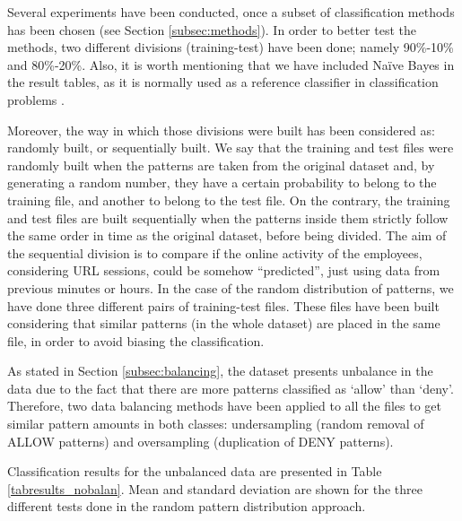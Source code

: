 \documentclass{llncs}
\begin{document}
\noindent Several experiments have been conducted, once a subset of classification methods has been chosen (see Section \ref{subsec:methods}). In order to better test the methods, two different divisions (training-test) have been done; namely 90\%-10\% and 80\%-20\%. 
Also, it is worth mentioning that we have included Na\"ive Bayes in the result tables, as it is normally used as a reference classifier in classification problems \cite{Frank2011}.

Moreover, the way in which those divisions were built has been considered as: randomly built, or sequentially built. We say that the training and test files were randomly built when the patterns are taken from the original dataset and, by generating a random number, they have a certain probability to belong to the training file, and another to belong to the test file. On the contrary, the training and test files are built sequentially when the patterns inside them strictly follow the same order in time as the original dataset, before being divided. The aim of the sequential division is to compare if the online activity of the employees, considering URL sessions, could be somehow ``predicted'', just using data from previous minutes or hours.
In the case of the random distribution of patterns, we have done three different pairs of training-test files. These files have been built considering that similar patterns (in the whole dataset) are placed in the same file, in order to avoid biasing the classification.

As stated in Section \ref{subsec:balancing}, the dataset presents unbalance in the data due to the fact that there are more patterns classified as `allow' than `deny'. Therefore, two data balancing methods have been applied to all the files to get similar pattern amounts in both classes: undersampling (random removal of ALLOW patterns) and oversampling (duplication of DENY patterns).

Classification results for the unbalanced data are presented in Table \ref{tabresults_nobalan}. Mean and standard deviation are shown for the three different tests done in the random pattern distribution approach.
\end{document}
